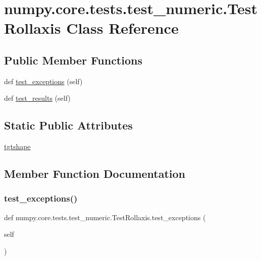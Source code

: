 \hypertarget{classnumpy_1_1core_1_1tests_1_1test__numeric_1_1TestRollaxis}{}\section{numpy.\+core.\+tests.\+test\+\_\+numeric.\+Test\+Rollaxis Class Reference}
\label{classnumpy_1_1core_1_1tests_1_1test__numeric_1_1TestRollaxis}
\subsection*{Public Member Functions}
\begin{DoxyCompactItemize}
\item 
def \hyperlink{classnumpy_1_1core_1_1tests_1_1test__numeric_1_1TestRollaxis_a5295307bdf762c86ae2ae6f31fd77971}{test\+\_\+exceptions} (self)
\item 
def \hyperlink{classnumpy_1_1core_1_1tests_1_1test__numeric_1_1TestRollaxis_a9922df21e1db4c1f4f8e15fd764a38ac}{test\+\_\+results} (self)
\end{DoxyCompactItemize}
\subsection*{Static Public Attributes}
\begin{DoxyCompactItemize}
\item 
\hyperlink{classnumpy_1_1core_1_1tests_1_1test__numeric_1_1TestRollaxis_a69dedea647a7392434539c640f76f6e1}{tgtshape}
\end{DoxyCompactItemize}


\subsection{Member Function Documentation}
\mbox{\label{classnumpy_1_1core_1_1tests_1_1test__numeric_1_1TestRollaxis_a5295307bdf762c86ae2ae6f31fd77971}} 
\subsubsection{\texorpdfstring{test\+\_\+exceptions()}{test\_exceptions()}}
{\footnotesize\ttfamily def numpy.\+core.\+tests.\+test\+\_\+numeric.\+Test\+Rollaxis.\+test\+\_\+exceptions (\begin{DoxyParamCaption}\item[{}]{self }\end{DoxyParamCaption})}

